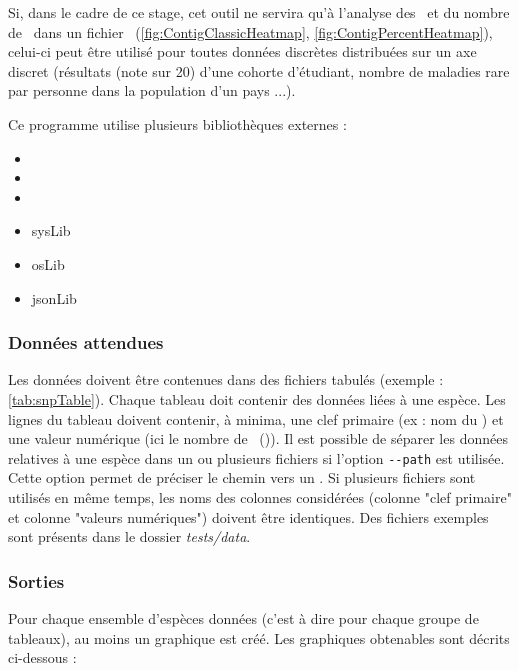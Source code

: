 \documentclass[../main]{subfiles} %
\begin{document}
Si, dans le cadre de ce stage, cet outil ne servira qu'à l'analyse des \SNP et du nombre de \contigs dans un fichier \bam (\cref{fig:ContigClassicHeatmap}, \cref{fig:ContigPercentHeatmap}), celui-ci peut être utilisé pour toutes données discrètes distribuées sur un axe discret (résultats (note sur 20) d'une cohorte d'étudiant, nombre de maladies rare par personne dans la population d'un pays ...).

Ce programme utilise plusieurs bibliothèques externes : 
\begin{multicols}{3}
    \begin{itemize}
        \item \pytest
        \item \MatPlotLib
        \item \getopts
        \item \gls{sysLib}
        \item \gls{osLib}
        \item \gls{jsonLib}
    \end{itemize}
\end{multicols}

\subsubsection{Données attendues}
Les données doivent être contenues dans des fichiers tabulés (exemple : \cref{tab:snpTable}). Chaque tableau doit contenir des données liées à une espèce. Les lignes du tableau doivent contenir, à minima, une clef primaire (ex : nom du \contig) et une valeur numérique (ici le nombre de \SNP (\NbSNP)). Il est possible de séparer les données relatives à une espèce dans un ou plusieurs fichiers si l’option \lstinline{--path} est utilisée. Cette option permet de préciser le chemin vers un \json. Si plusieurs fichiers sont utilisés en même temps, les noms des colonnes considérées (colonne "clef primaire" et colonne "valeurs numériques") doivent être identiques. Des fichiers exemples sont présents dans le dossier \textit{tests/data}.



\subsubsection{Sorties}
Pour chaque ensemble d’espèces données (c’est à dire pour chaque groupe de tableaux), au moins un graphique est créé. Les graphiques obtenables sont décrits ci-dessous :
\end{document}
